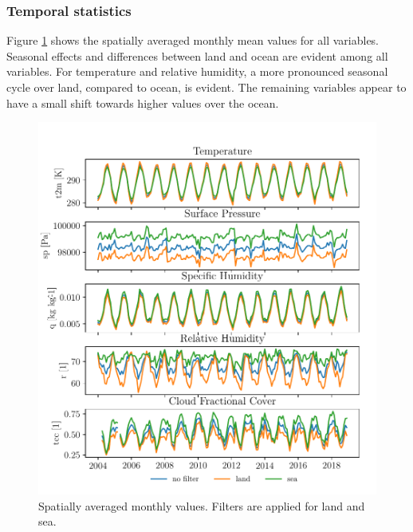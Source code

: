 \subsubsection{Temporal statistics}
Figure \ref{fig:monthly_mean_ts_vars} shows the spatially averaged monthly mean values for all variables. Seasonal effects and differences between land and ocean are evident among all variables. For temperature and relative humidity, a more pronounced seasonal cycle over land, compared to ocean, is evident. The remaining variables appear to have a small shift towards higher values over the ocean.
\begin{figure}[ht]
    \centering
    \includegraphics{python_figs/monthly_means.pdf}
    \caption{Spatially averaged monthly values. Filters are applied for land and sea.}
    \label{fig:monthly_mean_ts_vars}
\end{figure}

